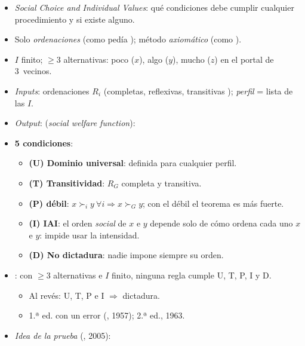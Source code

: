 \documentclass{article}
\begin{document}
\begin{columnas}
\begin{itemize}
\item \emph{Social Choice and Individual Values}: qué condiciones debe cumplir cualquier procedimiento y si existe alguno.
\item Solo \emph{ordenaciones} (como pedía ); método \emph{axiomático} (como ).
\end{itemize}
\begin{itemize}
\item $I$ finito; $\geq3$ alternativas: poco ($x$), algo ($y$), mucho ($z$) en el portal de 3~vecinos.
\item \emph{Inputs}: ordenaciones $R_i$ (completas, reflexivas, transitivas ); \emph{perfil} = lista de las $I$.
\item \emph{Output}:  (\emph{social welfare function}):
\item \textbf{5 condiciones}:
  \begin{itemize}
  \item \textbf{(U) Dominio universal}: definida para cualquier perfil.
  \item \textbf{(T) Transitividad}: $R_G$ completa y transitiva.
  \item \textbf{(P)  débil}: $x\succ_iy\ \forall i\Rightarrow x\succ_Gy$; con el débil el teorema es más fuerte.
  \item \textbf{(\textup{I}) IAI}: el orden \emph{social} de $x$ e $y$ depende solo de cómo ordena cada uno $x$ e $y$: impide usar la intensidad.
  \item \textbf{(D) No dictadura}: nadie impone siempre su orden.
  \end{itemize}
\end{itemize}
\begin{itemize}
\item {}: con $\geq3$ alternativas e $I$ finito, ninguna regla cumple U, T, P, I y D.
  \begin{itemize}
  \item Al revés: U, T, P e I $\Rightarrow$ dictadura.
  \item 1.ª ed. con un error (, 1957); 2.ª ed., 1963.
  \end{itemize}
\item \emph{Idea de la prueba} (, 2005):

\end{itemize}
\end{columnas}
\end{document}
